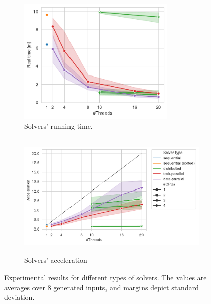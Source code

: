 \documentclass[epsf,epic,eepic,eepicemu]{article}
\begin{document}
\begin{figure}[htbp]
    \begin{subfigure}{0.3\textwidth}
        \includegraphics[height=6cm]{assets/running-time.pdf}
        \caption{Solvers' running time.}
        \label{fig:running-time}
    \end{subfigure}\hspace{2.5cm}
    \begin{subfigure}{0.3\textwidth}
        \includegraphics[height=6cm]{assets/acceleration.pdf}
        \caption{Solvers' acceleration}
        \label{fig:acceleration}
    \end{subfigure}
    \caption[Experimental results for different types of solvers.]{Experimental results for different types of solvers. The values are averages over 8 generated inputs, and margins depict standard deviation.}
    \label{fig:results}
\end{figure}

\end{document}
